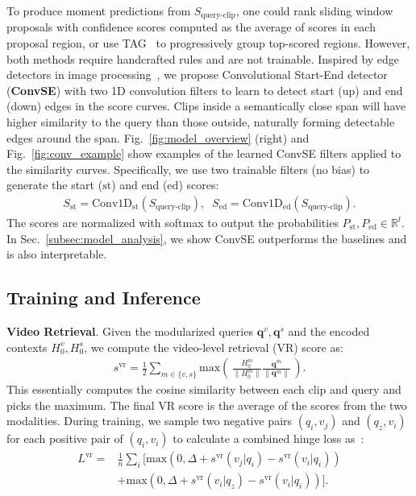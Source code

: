 \documentclass[runningheads]{llncs}
\begin{document}
To produce moment predictions from $S_{\mathrm{query\mbox{-}clip}}$, one could rank sliding window proposals with confidence scores computed as the average of scores in each proposal region, or use TAG~\cite{zhao2017temporal} to progressively group top-scored regions. However, both methods require handcrafted rules and are not trainable. Inspired by edge detectors in image processing~\cite{szeliski2010computer}, we propose Convolutional Start-End detector (\textbf{ConvSE}) with two 1D convolution filters to learn to detect start (up) and end (down) edges in the score curves. Clips inside a semantically close span will have higher similarity to the query than those outside, naturally forming detectable edges around the span. Fig.~\ref{fig:model_overview} (right) and Fig.~\ref{fig:conv_example} show examples of the learned ConvSE filters applied to the similarity curves. Specifically, we use two trainable filters (no bias) to generate the start ($\mathrm{st}$) and end ($\mathrm{ed}$) scores:
\begin{align}
    S_{\mathrm{st}} = \mathrm{Conv1D}_{\mathrm{st}}(S_{\mathrm{query\mbox{-}clip}}), \;\;
    S_{\mathrm{ed}} = \mathrm{Conv1D}_{\mathrm{ed}}(S_{\mathrm{query\mbox{-}clip}}).
\end{align}
The scores are normalized with softmax to output the probabilities $P_{\mathrm{st}}, P_{\mathrm{ed}} \in \mathbb{R}^{l}$. 
In Sec.~\ref{subsec:model_analysis}, we show ConvSE outperforms the baselines and is also interpretable.


\subsection{Training and Inference}\label{subsec:training_inference}
\noindent\textbf{Video Retrieval}.
Given the modularized queries $\mathbf{q}^{v}, \mathbf{q}^{s}$ and the encoded contexts $H^{v}_{0}, H^{s}_{0}$, we compute the video-level retrieval (VR) score as:
\begin{align}
    s^{\mathrm{vr}} = \frac{1}{2}\sum_{m\in \{v, s\}} \mathrm{max}(\, \frac{H^{m}_{0}}{\left\lVert H^{m}_{0}\right\rVert} \frac{\mathbf{q}^{m}}{\left\lVert \mathbf{q}^{m}\right\rVert}\, ).
\end{align}
This essentially computes the cosine similarity between each clip and query and picks the maximum.
The final VR score is the average of the scores from the two modalities.
During training, we sample two negative pairs $(q_i, v_j)$ and $(q_z, v_i)$ for each positive pair of $(q_i, v_i)$ to calculate a combined hinge loss as~\cite{yu2018mattnet}:
\begin{align}
    L^{\mathrm{vr}} =& \frac{1}{n} \sum_i [\mathrm{max}(0, \Delta + s^{\mathrm{vr}}(v_j|q_i) - s^{\mathrm{vr}}(v_i|q_i)) \nonumber \\
    &+ \mathrm{max}(0, \Delta + s^{\mathrm{vr}}(v_i|q_z) - s^{\mathrm{vr}}(v_i|q_i)) ].
\end{align}
\end{document}
